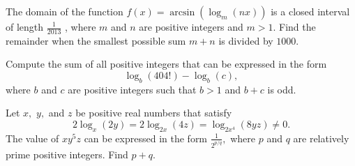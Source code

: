 \documentclass[mast]{lucky}
\begin{document}
\begin{prob}[AIME I 2013/8]{6}
The domain of the function $f(x) = \arcsin(\log_{m}(nx))$ is a closed interval of length $\frac{1}{2013}$ , where $m$ and $n$ are positive integers and $m>1$. Find the remainder when the smallest possible sum $m+n$ is divided by $1000.$
\end{prob}

\begin{prob}{6}
Compute the sum of all positive integers that can be expressed in the form \[\log_b(404!) - \log_b(c), \] where $b$ and $c$ are positive integers such that $b>1$ and $b+c$ is odd.
\end{prob}

\begin{prob}[AIME I 2012/9]{9}
Let $x,$ $y,$ and $z$ be positive real numbers that satisfy \[2\log_{x}(2y) = 2\log_{2x}(4z) = \log_{2x^4}(8yz) \ne 0.\] The value of $xy^5z$ can be expressed in the form $\frac{1}{2^{p/q}},$ where $p$ and $q$ are relatively prime positive integers. Find $p+q.$
\end{prob}
\end{document}
